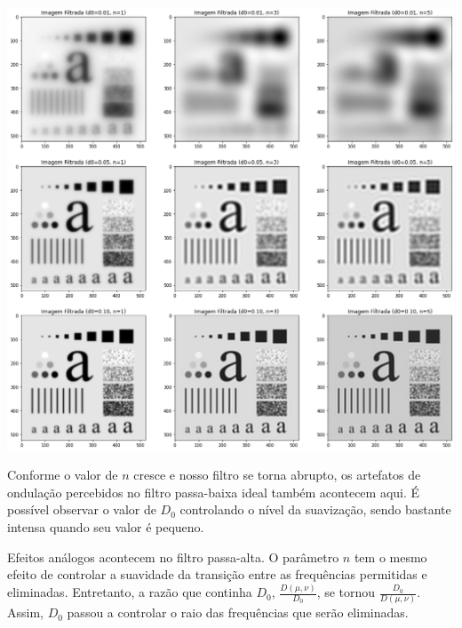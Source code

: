 \documentclass[12pt,a4paper]{article}
\begin{document}
\vspace{1em}
\begin{center}
	\includegraphics[width=\textwidth]{imagens_low_pass}
\end{center}
\vspace{1em}

Conforme o valor de $n$ cresce e nosso filtro se torna abrupto, os artefatos de ondulação percebidos no filtro passa-baixa ideal também acontecem aqui. É possível observar o valor de $D_0$ controlando o nível da suavização, sendo bastante intensa quando seu valor é pequeno.

Efeitos análogos acontecem no filtro passa-alta. O parâmetro $n$ tem o mesmo efeito de controlar a suavidade da transição entre as frequências permitidas e eliminadas. Entretanto, a razão que continha $D_0$, $\frac{D(\mu,\nu)}{D_0}$, se tornou $\frac{D_0}{D(\mu,\nu)}$. Assim, $D_0$ passou a controlar o raio das frequências que serão eliminadas.
\end{document}
